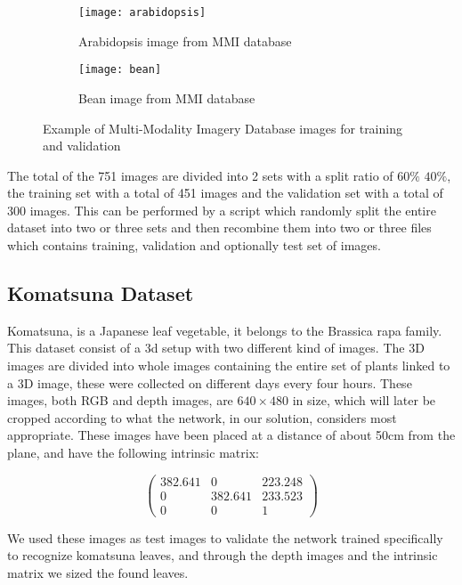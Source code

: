 \begin{figure}[ht] 
    \centering
    \begin{subfigure}{.5\textwidth}
      \centering
      \texttt{[image: arabidopsis]}
      \caption{Arabidopsis image from MMI database}
      \label{fig:sub1}
    \end{subfigure}%
    \begin{subfigure}{.5\textwidth}
      \centering
      \texttt{[image: bean]}
      \caption{Bean image from MMI database}
      \label{fig:sub2}
    \end{subfigure}
    \caption{Example of Multi-Modality Imagery Database images for training and validation}
    \label{fig:MMI}
\end{figure}

The total of the 751 images are divided into 2 sets with a split ratio of $60\%$ $40\%$, the training set with a total of 451 images and the validation set with a
total of 300 images. This can be performed by a script which randomly split the entire dataset into two or three sets and then recombine them into two or three files which
contains training, validation and optionally test set of images.

\subsection{Komatsuna Dataset}
Komatsuna, is a Japanese leaf vegetable, it belongs to the Brassica rapa family. This dataset consist of a 3d setup with two different kind of images. The 3D images are
divided into whole images containing the entire set of plants linked to a 3D image, these were collected on different days every four hours. These images, both RGB and
depth images, are $640\times 480$ in size, which will later be cropped according to what the network, in our solution, considers most appropriate. These images have been
placed at a distance of about 50cm from the plane, and have the following intrinsic matrix:

$$
\begin{pmatrix}
    382.641 & 0       & 223.248 \\     
    0       & 382.641 & 233.523 \\
    0       &       0 & 1
\end{pmatrix}
$$

We used these images as test images to validate the network trained specifically to recognize komatsuna leaves, and through the depth images and the intrinsic matrix
we sized the found leaves.

